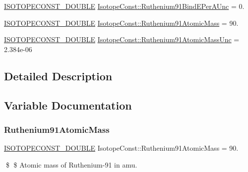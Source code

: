 \begin{DoxyCompactItemize}
\mbox{\hyperlink{group___isotope_const-_macros_ga8f45a7272ce02c0b4c65c44636ed719a}{I\+S\+O\+T\+O\+P\+E\+C\+O\+N\+S\+T\+\_\+\+D\+O\+U\+B\+LE}} \mbox{\hyperlink{group___isotope_const-_ruthenium-_ru91_gadd9899a6780f537f77d69b3ba7b1cf79}{Isotope\+Const\+::\+Ruthenium91\+Bind\+E\+Per\+A\+Unc}} = 0.
\item 
\mbox{\hyperlink{group___isotope_const-_macros_ga8f45a7272ce02c0b4c65c44636ed719a}{I\+S\+O\+T\+O\+P\+E\+C\+O\+N\+S\+T\+\_\+\+D\+O\+U\+B\+LE}} \mbox{\hyperlink{group___isotope_const-_ruthenium-_ru91_ga7a2c2e716eb0107ed933d6cb2594bd6d}{Isotope\+Const\+::\+Ruthenium91\+Atomic\+Mass}} = 90.
\item 
\mbox{\hyperlink{group___isotope_const-_macros_ga8f45a7272ce02c0b4c65c44636ed719a}{I\+S\+O\+T\+O\+P\+E\+C\+O\+N\+S\+T\+\_\+\+D\+O\+U\+B\+LE}} \mbox{\hyperlink{group___isotope_const-_ruthenium-_ru91_gabd0d77a406d2a97848435354440e2657}{Isotope\+Const\+::\+Ruthenium91\+Atomic\+Mass\+Unc}} = 2.\+384e-\/06
\end{DoxyCompactItemize}


\subsection{Detailed Description}


\subsection{Variable Documentation}
\mbox{\label{group___isotope_const-_ruthenium-_ru91_ga7a2c2e716eb0107ed933d6cb2594bd6d}} 
\subsubsection{\texorpdfstring{Ruthenium91\+Atomic\+Mass}{Ruthenium91AtomicMass}}
{\footnotesize\ttfamily \mbox{\hyperlink{group___isotope_const-_macros_ga8f45a7272ce02c0b4c65c44636ed719a}{I\+S\+O\+T\+O\+P\+E\+C\+O\+N\+S\+T\+\_\+\+D\+O\+U\+B\+LE}} Isotope\+Const\+::\+Ruthenium91\+Atomic\+Mass = 90.}

\$ \$ Atomic mass of Ruthenium-\/91 in amu. \mbox{\label{group___isotope_const-_ruthenium-_ru91_gabd0d77a406d2a97848435354440e2657}} 
